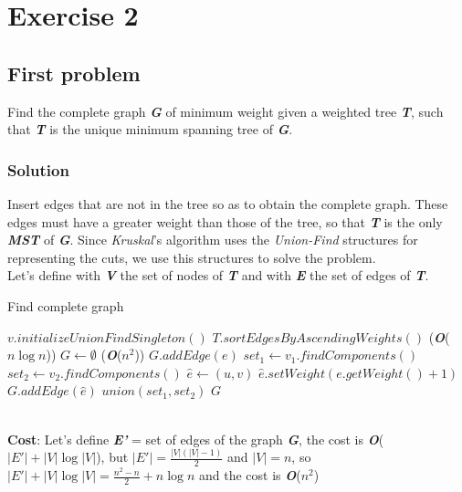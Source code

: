 \documentclass[11pt]{article}
\begin{document}
\section*{Exercise 2}
\subsection*{First problem}
Find the complete graph \textbf{\textit{G}} of minimum weight given a weighted tree \textbf{\textit{T}}, such that  \textbf{\textit{T}} is the unique minimum spanning tree of \textbf{\textit{G}}.
\subsubsection*{Solution}
Insert edges that are not in the tree so as to obtain the complete graph. These edges must have a greater weight than those of the tree, so that \textbf{\textit{T}} is the only \textbf{\textit{MST}} of \textbf{\textit{G}}. Since \textit{Kruskal}'s algorithm uses the \textit{Union-Find} structures for representing the cuts, we use this structures to solve the problem. \\
Let's define with \textbf{\textit{V}} the set of nodes of \textbf{\textit{T}} and with \textbf{\textit{E}} the set of edges of \textbf{\textit{T}}.
\begin{algorithm}
	\caption{Find complete graph}\label{euclid}
	\begin{algorithmic}[1]
			\State $v.initializeUnionFindSingleton()$
		\EndFor
		\State $T.sortEdgesByAscendingWeights()$ \qquad \qquad \qquad \qquad \qquad \qquad \qquad (\textbf{\textit{O}}($n\log{n}$))
		\State $G \gets \emptyset$
		 \qquad \qquad \qquad \qquad \qquad \qquad \qquad \qquad \qquad \qquad (\textbf{\textit{O}}($n^2$))
			\State  $G.addEdge(e)$
			\State  $set_1 \gets v_1.findComponents()$
			\State  $set_2 \gets v_2.findComponents()$
					\State $\hat{e} \gets (u, v)$
						\State $\hat{e}.setWeight(e.getWeight() + 1)$
						\State $G.addEdge(\hat{e})$
					\EndIf
				\EndFor
			\EndFor
			\State $union(set_1, set_2)$
		\EndFor
		\State \Return $G$
	\end{algorithmic}
\end{algorithm} \\
\textbf{Cost}: Let's define \textbf{\textit{E'}} = set of edges of the graph \textbf{\textit{G}}, the cost is \textbf{\textit{O}}($|E'| + |V|\log{|V|}$), but $|E'| = \frac{|V|(|V| - 1)}{2}$ and $|V| = n$, so $|E'| + |V|\log{|V|} = \frac{n^2 - n}{2} + n\log{n}$ and the cost is \textbf{\textit{O}}($n^2$)
\end{document}
